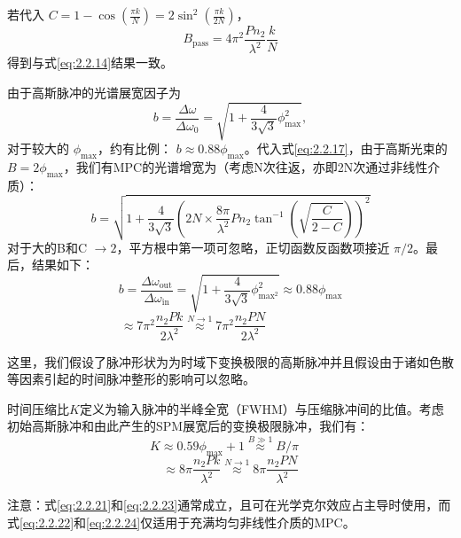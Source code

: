 \documentclass[14pt,a4paper,oneside]{article}
\numberwithin{equation}{subsection}             %
\numberwithin{figure}{subsection}               %
\begin{document}
若代入 $C=1-\cos(\frac{\pi k}{N})=2\sin^2(\frac{\pi k}{2N})$，
\begin{equation}
    B_{\mathrm{pass}}=4\pi^2\frac{Pn_2}{\lambda^2}\frac kN
    \label{eq:2.2.18}
\end{equation}
得到与式\ref{eq:2.2.14}结果一致。

由于高斯脉冲的光谱展宽因子为
\begin{equation}
    b=\frac{\Delta\omega}{\Delta\omega_0}=\sqrt{1+\frac4{3\sqrt{3}}\phi_{\max}^2},
    \label{eq:2.2.19}
\end{equation}
对于较大的 $\phi_{\mathrm{max}}$，约有比例： $b\approx 0.88\phi_{\mathrm{max}}$。代入式\ref{eq:2.2.17}，由于高斯光束的 $B=2\phi_{\mathrm{max}}$，我们有MPC的光谱增宽为（考虑N次往返，亦即2N次通过非线性介质）：
\begin{equation}
    b=\sqrt{1+\frac4{3\sqrt{3}}{\left(2N\times\frac{8\pi}{\lambda^2}Pn_2{\tan}^{-1}\left(\sqrt{\frac C{2-C}}\right)\right)^2}}
    \label{eq:2.2.20}
\end{equation}
对于大的B和C $\rightarrow 2$，平方根中第一项可忽略，正切函数反函数项接近 $\pi/2$。最后，结果如下：
\begin{equation}
    b=\frac{\Delta\omega_{\mathrm{out}}}{\Delta\omega_{\mathrm{in}}}=\sqrt{1+\frac4{3\sqrt{3}}\phi_{\mathrm{max}^2}^2}\approx0.88\phi_{\mathrm{max}}
    \label{eq:2.2.21}
\end{equation}
\begin{equation}
    \approx7\pi^2\frac{n_2Pk}{2\lambda^2}\overset{N\to1}{\operatorname*{\approx}}7\pi^2\frac{n_2PN}{2\lambda^2}\quad\quad\quad\quad\quad\quad
    \label{eq:2.2.22}
\end{equation}


这里，我们假设了脉冲形状为为时域下变换极限的高斯脉冲并且假设由于诸如色散等因素引起的时间脉冲整形的影响可以忽略。

时间压缩比$K$定义为输入脉冲的半峰全宽（FWHM）与压缩脉冲间的比值。考虑初始高斯脉冲和由此产生的SPM展宽后的变换极限脉冲，我们有：
\begin{equation}
    K\approx0.59\phi_{\max}+1\overset{B\gg1}{\operatorname*{\approx}}B/\pi \quad
    \label{eq:2.2.23}
\end{equation}
\begin{equation}
    \approx8\pi\frac{n_2Pk}{\lambda^2}\overset{N\to1}{\operatorname*{\approx}}8\pi\frac{n_2PN}{\lambda^2}
    \label{eq:2.2.24}
\end{equation}

注意：式\ref{eq:2.2.21}和\ref{eq:2.2.23}通常成立，且可在光学克尔效应占主导时使用，而式\ref{eq:2.2.22}和\ref{eq:2.2.24}仅适用于充满均匀非线性介质的MPC。
\end{document}

